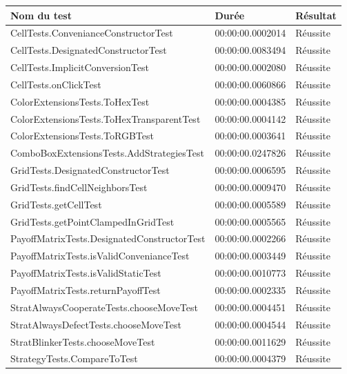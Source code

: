 \documentclass[a4paper, french]{article}
\begin{document}
\begin{table}[htp]
\centering
\begin{tabular}{lll}
\hline
\textbf{Nom du test}                        & \textbf{Durée}   & \textbf{Résultat} \\ \hline
CellTests.ConvenianceConstructorTest         & 00:00:00.0002014 & Réussite \\
CellTests.DesignatedConstructorTest          & 00:00:00.0083494 & Réussite \\
CellTests.ImplicitConversionTest             & 00:00:00.0002080 & Réussite \\
CellTests.onClickTest                        & 00:00:00.0060866 & Réussite \\
ColorExtensionsTests.ToHexTest               & 00:00:00.0004385 & Réussite \\
ColorExtensionsTests.ToHexTransparentTest    & 00:00:00.0004142 & Réussite \\
ColorExtensionsTests.ToRGBTest               & 00:00:00.0003641 & Réussite \\
ComboBoxExtensionsTests.AddStrategiesTest    & 00:00:00.0247826 & Réussite \\
GridTests.DesignatedConstructorTest          & 00:00:00.0006595 & Réussite \\
GridTests.findCellNeighborsTest              & 00:00:00.0009470 & Réussite \\
GridTests.getCellTest                        & 00:00:00.0005589 & Réussite \\
GridTests.getPointClampedInGridTest          & 00:00:00.0005565 & Réussite \\
PayoffMatrixTests.DesignatedConstructorTest  & 00:00:00.0002266 & Réussite \\
PayoffMatrixTests.isValidConvenianceTest     & 00:00:00.0003449 & Réussite \\
PayoffMatrixTests.isValidStaticTest          & 00:00:00.0010773 & Réussite \\
PayoffMatrixTests.returnPayoffTest           & 00:00:00.0002335 & Réussite \\
StratAlwaysCooperateTests.chooseMoveTest     & 00:00:00.0004451 & Réussite \\
StratAlwaysDefectTests.chooseMoveTest        & 00:00:00.0004544 & Réussite \\
StratBlinkerTests.chooseMoveTest             & 00:00:00.0011629 & Réussite \\
StrategyTests.CompareToTest                  & 00:00:00.0004379 & Réussite \\

\end{tabular}
\end{table}
\end{document}
